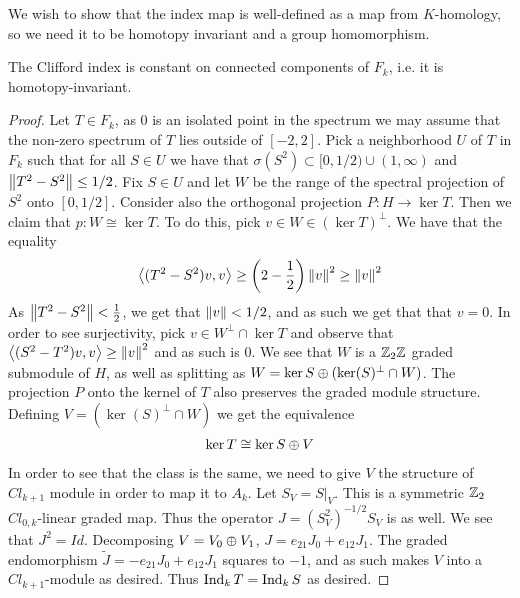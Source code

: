 We wish to show that the index map is well-defined as a map from $K$-homology, so we need it to be homotopy invariant and a group homomorphism. 
\begin{theorem}\label{welldef}
	The Clifford index is constant on connected components of $F_k$, i.e. it is homotopy-invariant. 
\end{theorem}
\begin{proof}
	Let $T\in F_k$, as $0$ is an isolated point in the spectrum we may assume that the non-zero spectrum of $T$ lies outside of $[-2,2]$. Pick a neighborhood $U$ of $T$ in $F_k$ such that for all $S\in U$ we have that $\sigma(S^2)\subset [0,1/2)\cup (1,\infty)$ and $\left \Vert T^2-S^2 \right \Vert\leq 1/2$. Fix $S\in U$ and let $W$ be the range of the spectral projection of $S^2$ onto $[0,1/2]$. 
	Consider also the orthogonal projection $P:H\to \ker T$. Then we claim that $p:W\cong \ker T$. To do this, pick $v\in W\in (\ker T)^\perp$. We have that the equality 
	\begin{align*}
		\left \langle (T^2-S^2)v,v \right \rangle\geq \left ( 2-\frac{1}{2} \right )\left \Vert v \right \Vert^2\geq \left \Vert v \right \Vert^2
	\end{align*}
	As $\left \Vert T^2-S^2 \right \Vert<\frac{1}{2}$, we get that $\left \Vert v \right \Vert<1/2$, and as such we get that that $v=0$. In order to see surjectivity, pick $v\in W^\perp \cap \ker T$ and observe that $\left \langle (S^2-T^2)v,v \right \rangle\geq \left \Vert v \right \Vert^2$ and as such is 0. 
	We see that $W$ is a $\mathbb{Z}_2\mathbb{Z}$ graded submodule of $H$, as well as splitting as $W=\ker S\oplus (\ker (S)^\perp \cap W)$. The projection $P$ onto the kernel of $T$ also preserves the graded module structure. Defining $V=(\ker (S)^\perp \cap W)$ we get the equivalence
	\begin{align*}
		\ker T\cong \ker S\oplus V
	\end{align*}
	In order to see that the class is the same, we need to give $V$ the structure of $Cl_{k+1}$ module in order to map it to $A_k$.
	Let $S_V=S|_V$. This is a symmetric $\mathbb{Z}_2$ $Cl_{0,k}$-linear graded map. Thus the operator $J=(S^2_V)^{-1/2}S_V$ is as well. We see that $J^2=Id$. Decomposing $V=V_0\oplus V_1$, $J=e_{21}J_0+e_{12}J_1$. The graded endomorphism $\tilde{J}=-e_{21}J_0+e_{12}J_1$ squares to $-1$, and as such makes $V$ into a $Cl_{k+1}$-module as desired. Thus $\operatorname{Ind}_k T=\operatorname{Ind}_k S$ as desired. 
\end{proof}
\begin{comment}
To show that the Clifford index actually gives a homomorphism, ie. that two operators are homotopic if and only if they have the same index, we have the following theorem due to Atiyah and Singer. 
\begin{theorem}
	The Clifford index induces a bijection $\pi_0(\tilde{\F}_k) \to KO^{-k}(\{*\})$
\end{theorem}
\end{comment}
